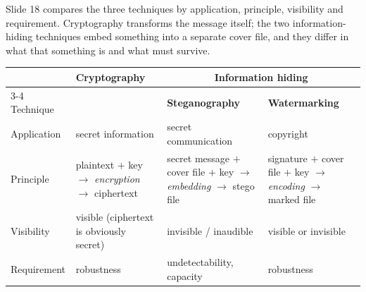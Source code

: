 Slide 18 compares the three techniques by application, principle, visibility and requirement. Cryptography transforms the message itself; the two information-hiding techniques embed something into a separate cover file, and they differ in what that something is and what must survive.
\begin{center}\small
\begin{tabularx}{\textwidth}{@{}l X X X@{}}
\toprule
 & \textbf{Cryptography} & \multicolumn{2}{c}{\textbf{Information hiding}}\\
\cmidrule(l){3-4}
Technique & & \textbf{Steganography} & \textbf{Watermarking}\\
\midrule
Application & secret information & secret communication & copyright\\
Principle & plaintext $+$ key $\to$ \emph{encryption} $\to$ ciphertext & secret message $+$ cover file $+$ key $\to$ \emph{embedding} $\to$ stego file & signature $+$ cover file $+$ key $\to$ \emph{encoding} $\to$ marked file\\
Visibility & visible (ciphertext is obviously secret) & invisible / inaudible & visible or invisible\\
Requirement & robustness & undetectability, capacity & robustness\\
\bottomrule
\end{tabularx}
\end{center}

